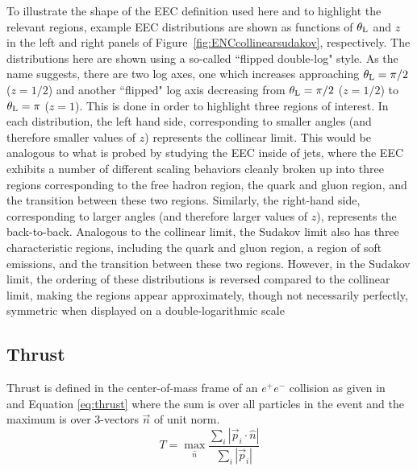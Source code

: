 \documentclass[a4paper,11pt]{article}
\begin{document}
To illustrate the shape of the EEC definition used here and to highlight the relevant regions, example EEC distributions are shown as functions of $\theta_{\rm L}$ and $z$  in the left and right panels of Figure~\ref{fig:ENCcollinearsudakov}, respectively.
 The distributions here are shown using a so-called ``flipped double-log" style. As the name suggests, there are two log axes, one which increases approaching $\theta_{\rm L} = \pi/2$ ($z = 1/2$) and another ``flipped" log axis decreasing from $\theta_{\rm L} = \pi/2$ ($z = 1/2$) to $\theta_{\rm L} = \pi$ ($z = 1$). This is done in order to highlight three regions of interest. In each distribution, the left hand side, corresponding to smaller angles (and therefore smaller values of $z$) represents the collinear limit. This would be analogous to what is probed by studying the EEC inside of jets, where the EEC exhibits a number of different scaling behaviors cleanly broken up into three regions corresponding to the free hadron region, the quark and gluon region, and the transition between these two regions. Similarly, the right-hand side, corresponding to larger angles (and therefore larger values of $z$), represents the back-to-back. Analogous to the collinear limit, the Sudakov limit also has three characteristic regions, including the quark and gluon region, a region of soft emissions, and the transition between these two regions. 
 However, in the Sudakov limit, the ordering of these distributions is reversed compared to the collinear limit, making the regions appear approximately, though not necessarily perfectly, symmetric when displayed on a double-logarithmic scale

\subsection{Thrust}

Thrust is defined in the center-of-mass frame of an $e^{+}e^{-}$ collision as given in~\cite{PhysRevLett.39.1587} and Equation \ref{eq:thrust} where the sum is over all particles in the event and the maximum is over 3-vectors $\vec{n}$ of unit norm. 
\begin{equation}\label{eq:thrust}
T = \max_{\hat{n}} \frac{\sum_i |\vec{p}_i \cdot \hat{n}|}{\sum_i |\vec{p}_i|}
\end{equation}
\end{document}
